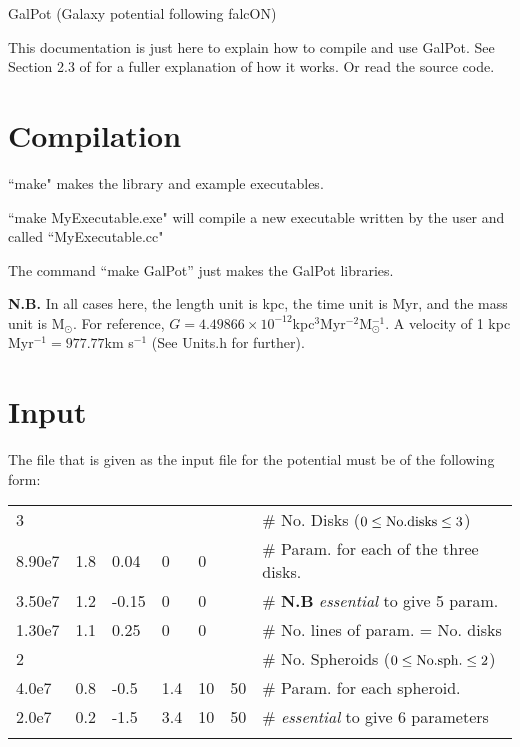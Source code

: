 \documentclass{article}
\begin{document}
\begin{center}
{\huge GalPot (Galaxy potential following falcON)}
\end{center}


This documentation is just here to explain how to compile and use 
GalPot. See Section 2.3 of \citet{DB98} for a fuller explanation of how it works.
Or read the source code. 

\section{Compilation}
``make" makes the library and example executables.

\noindent``make MyExecutable.exe" will compile a new executable written by the user and called ``MyExecutable.cc" 

\noindent The command ``make GalPot'' just makes the GalPot libraries. 

 {\bf N.B.} In all cases here, the length unit is kpc, the time unit is Myr, and the mass unit is
M$_\odot$. For reference, $G=4.49866\times
10^{-12}$kpc$^3$Myr$^{-2}$M$_\odot^{-1}$. A velocity of 1 kpc Myr$^{-1}
  = 977.77$km s$^{-1}$ (See Units.h for further).

\section{Input} 
The file that is given as the input file for the potential must be of
the following form:
\vspace{5mm}

\begin{tabular}{lllllll}
3      &     &      &     &    &     &\# No. Disks ($0\leq{\rm No.disks}\leq3$) \\
8.90e7 & 1.8 & 0.04 & 0   & 0  &     &\# Param. for each of the three disks.\\
3.50e7 & 1.2 & -0.15& 0   & 0  &     &\# {\bf N.B} {\it essential} to
give 5 param.\\  
1.30e7 & 1.1 & 0.25 & 0   & 0  &     &\# No. lines of param. = No. disks\\
2      &     &      &     &    &     &\# No. Spheroids ($0\leq{\rm
  No. sph.}\leq2$) \\
4.0e7   & 0.8 & -0.5 & 1.4 & 10 & 50 &\#  Param. for each spheroid. \\ 
2.0e7   & 0.2 & -1.5 & 3.4 & 10 & 50 &\# {\it essential} to give 6 parameters\\
\vspace{5mm}
\end{tabular}
\end{document}
